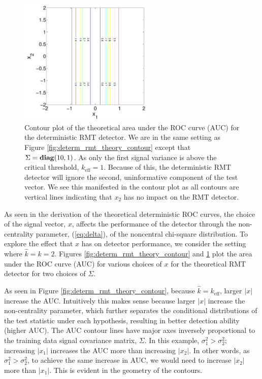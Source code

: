 \begin{figure}[t]
\centering
\includegraphics[width=2.5in]{figures/determ_rmt_theory_contour_small_keff.pdf}
\caption{Contour plot of the theoretical area under the ROC curve (AUC) for the deterministic RMT detector. We are in the same setting as Figure \ref{fig:determ_rmt_theory_contour} except that $\Sigma=\mathop{\bf diag}(10,1)$. As only the first signal variance is above the critical threshold, $k_{\text{eff}} = 1$. Because of this, the deterministic RMT detector will ignore the second, uninformative component of the test vector. We see this manifested in the contour plot as all contours are vertical lines indicating that $x_2$ has no impact on the RMT detector.}
\label{fig:determ_plugin_theory_contour}
\end{figure}

As seen in the derivation of the theoretical deterministic ROC curves, the choice of the signal vector, $x$, affects the performance of the detector through the non-centrality parameter, (\ref{eq:delta}), of the noncentral chi-square distribution. To explore the effect that $x$ has on detector performance, we consider the setting where $\widehat{k}=k=2$. Figures \ref{fig:determ_rmt_theory_contour} and \ref{fig:determ_plugin_theory_contour} plot the area under the ROC curve (AUC) for various choices of $x$ for the theoretical RMT detector for two choices of $\Sigma$.

As seen in Figure \ref{fig:determ_rmt_theory_contour}, because $\widehat{k}=k_\text{eff}$, larger $|x|$ increase the AUC. Intuitively this makes sense because larger $|x|$ increase the non-centrality parameter, which further separates the conditional distributions of the test statistic under each hypothesis, resulting in better detection ability (higher AUC). The AUC contour lines have major axes inversely proportional to the training data signal covariance matrix, $\Sigma$. In this example, $\sigma_1^2 > \sigma_2^2$; increasing $|x_1|$ increases the AUC more than increasing $|x_2|$. In other words, as $\sigma_1^2 >\sigma_2^2$, to achieve the same increase in AUC, we would need to increase $|x_2|$ more than $|x_1|$. This is evident in the geometry of the contours.

